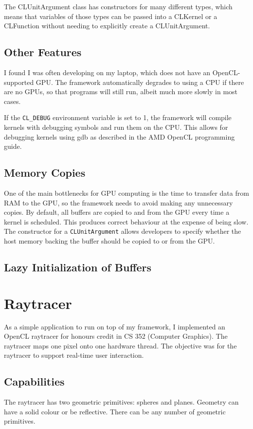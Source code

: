 \documentclass{article}
\begin{document}
The CLUnitArgument class has constructors for many different types, which means that variables of those types can be passed into a CLKernel or a CLFunction without needing to explicitly create a CLUnitArgument.

\subsection{Other Features}
I found I was often developing on my laptop, which does not have an OpenCL-supported GPU. The framework automatically degrades to using a CPU if there are no GPUs, so that programs will still run, albeit much more slowly in most cases.

If the \texttt{CL\_DEBUG} environment variable is set to 1, the framework will compile kernels with debugging symbols and run them on the CPU. This allows for debugging kernels using gdb as described in the AMD OpenCL programming guide\cite{amdapp}.

\subsection{Memory Copies}
One of the main bottlenecks for GPU computing is the time to transfer data from RAM to the GPU, so the framework needs to avoid making any unnecessary copies. By default, all buffers are copied to and from the GPU every time a kernel is scheduled. This produces correct behaviour at the expense of being slow. The constructor for a \texttt{CLUnitArgument} allows developers to specify whether the host memory backing the buffer should be copied to or from the GPU.

\subsection{Lazy Initialization of Buffers}


\section{Raytracer}
As a simple application to run on top of my framework, I implemented an OpenCL raytracer for honours credit in CS 352 (Computer Graphics). The raytracer maps one pixel onto one hardware thread. The objective was for the raytracer to support real-time user interaction.

\subsection{Capabilities}
The raytracer has two geometric primitives: spheres and planes. Geometry can have a solid colour or be reflective. There can be any number of geometric primitives.
\end{document}
